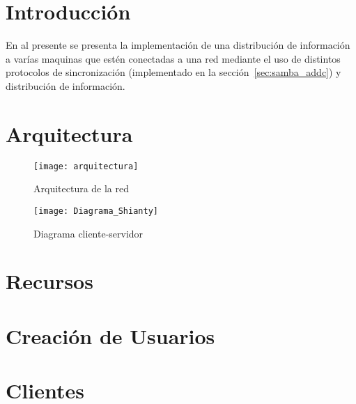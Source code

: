 \documentclass[letterpaper]{article}
\begin{document}


\tableofcontents
{}


\newpage


\section{Introducción}\label{sec:introduccion}
En al presente se presenta la implementación de una distribución de información
a varías maquinas que estén conectadas a una red mediante el uso de distintos
protocolos de sincronización (implementado en la sección~\ref{sec:samba_addc})
y distribución de información.


\section{Arquitectura}\label{sec:arq}
\begin{figure}[h!]
  \texttt{[image: arquitectura]}
  \caption{Arquitectura de la red}\label{fig:arquitectura}
\end{figure}

\begin{figure}[h!]
  \texttt{[image: Diagrama\_Shianty]}
  \caption{Diagrama cliente-servidor}\label{fig:dia_c_s}
\end{figure}



\section{Recursos}\label{sec:recursos}



\clearpage{}

\section{Creación de Usuarios}\label{sec:cusuarios}



\clearpage{}

\section{Clientes}\label{sec:clientes}



\listoffigures
{}
\listoflistings{}

\printglossary{}
\printglossary[type=\acronymtype]
\end{document}
